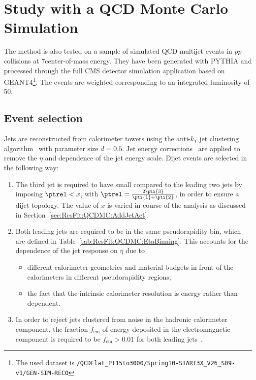 

\section{Study with a QCD Monte Carlo Simulation}\label{sec:ResFit:QCDMC}

The method is also tested on a sample of simulated QCD multijet events in $pp$ collisions at 7\tev center-of-mass energy.
They have been generated with PYTHIA and processed through the full CMS detector simulation application based on GEANT4\footnote{The used dataset is \texttt{/QCDFlat\_Pt15to3000/Spring10-START3X\_V26\_S09-v1/GEN-SIM-RECO}}.
The events are weighted corresponding to an integrated luminosity of 50\pbinv.


\subsection{Event selection}\label{sec:ResFit:QCDMC:EvtSel}

Jets are reconstructed from calorimeter towers using the anti-$k_{T}$ jet clustering algorithm~\cite{bib:akj} with parameter size $d=0.5$.
Jet energy corrections~\cite{bib:cmspas:jec} are applied to remove the $\eta$ and \pt dependence of the jet energy scale.
Dijet events are selected in the following way:
\begin{enumerate}
\item The third jet is required to have small \pt compared to the leading two jets by imposing \mbox{$\ptrel < x$}, with \mbox{$\ptrel = \frac{2\pti{3}}{\pti{1} + \pti{2}}$}, in order to ensure a dijet topology.
  The value of $x$ is varied in course of the analysis as discussed in Section~\ref{sec:ResFit:QCDMC:AddJetAct}.
\item Both leading jets are required to be in the same pseudorapidity bin, which are defined in Table~\ref{tab:ResFit:QCDMC:EtaBinning}.
  This accounts for the dependence of the jet \pt response on $\eta$ due to
  \begin{itemize}
  \item different calorimeter geometries and material budgets in front of the calorimeters in different pseudorapidity regions;
  \item the fact that the intrinsic calorimeter resolution is energy rather than \pt dependent.
  \end{itemize}
\item In order to reject jets clustered from noise in the hadronic calorimeter component, the fraction $f_{\text{em}}$ of energy deposited in the electromagnetic component is required to be \mbox{$f_{\text{em}} > 0.01$} for both leading jets~\cite{bib:cmspas:jetid}.
\end{enumerate}


